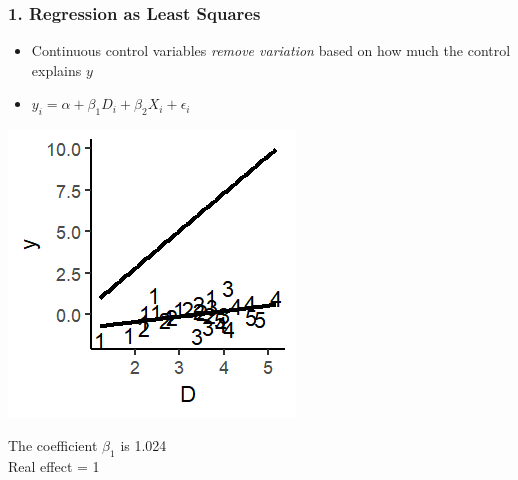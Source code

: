 \documentclass[xcolor=x11names,compress]{beamer}\usepackage[]{graphicx}\usepackage[]{color}
\makeatletter
\def\maxwidth{ %
  \ifdim\Gin@nat@width>\linewidth
    \linewidth
  \else
    \Gin@nat@width
  \fi
}
\newenvironment{knitrout}{}{} %
\renewcommand{\(}{\begin{columns}}
\renewcommand{\)}{\end{columns}}
\newcommand{\<}[1]{\begin{column}{#1}}
\renewcommand{\>}{\end{column}}
\makeatother
\begin{document}
\begin{frame}
\frametitle{1. Regression as Least Squares}
\begin{itemize}
\item Continuous control variables \textit{remove variation} based on how much the control explains $y$
\item $y_i = \alpha + \beta_1 D_i + \beta_2 X_i + \epsilon_i$
\end{itemize}
\begin{multicols}{2}
\begin{knitrout}
\color{fgcolor}
\includegraphics[width=\maxwidth]{figure/graph_ols_control3-1} 

\end{knitrout}
\columnbreak

The coefficient $\beta_1$ is 1.024 \\
Real effect = 1
\end{multicols}
\end{frame}
\end{document}
